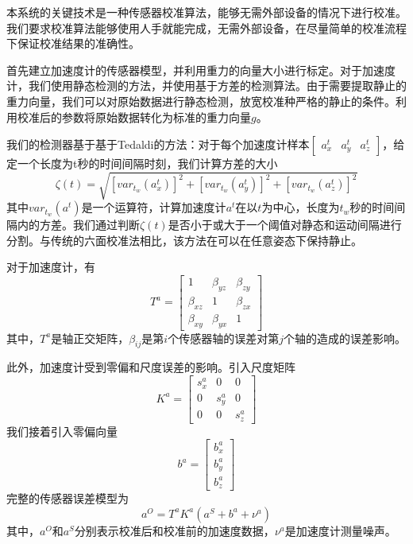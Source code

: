 \documentclass[
  type=master
]{gdutthesis}
\begin{document}
本系统的关键技术是一种传感器校准算法，能够无需外部设备的情况下进行校准。我们要求校准算法能够使用人手就能完成，无需外部设备，在尽量简单的校准流程下保证校准结果的准确性。

首先建立加速度计的传感器模型，并利用重力的向量大小进行标定\cite{jekeli2012inertial}。对于加速度计，我们使用静态检测的方法\cite{fong2008methods}，并使用基于方差的检测算法\cite{sabatini2006wavelet}。由于需要提取静止的重力向量，我们可以对原始数据进行静态检测，放宽校准种严格的静止的条件。利用校准后的参数将原始数据转化为标准的重力向量$g$。

我们的检测器基于基于Tedaldi的方法：对于每个加速度计样本$\begin{bmatrix}
	a^t_x & a^t_y & a^t_z
\end{bmatrix}$，给定一个长度为t秒的时间间隔时刻，我们计算方差的大小
\begin{equation}\label{eq:var}
	\zeta(t)=\sqrt{[var_{t_w}(a^t_x)]^2+[var_{t_w}(a^t_y)]^2+[var_{t_w}(a^t_z)]^2}
\end{equation}
其中$var_{t_w}(a^t)$是一个运算符，计算加速度计$a^t$在以$t$为中心，长度为$t_w$秒的时间间隔内的方差。我们通过判断$\zeta(t)$是否小于或大于一个阈值对静态和运动间隔进行分割。与传统的六面校准法相比\cite{尹杭2014一种}，该方法在可以在任意姿态下保持静止。

对于加速度计，有
\begin{equation}\label{eq:axiserror}
	T^{a}=
	\begin{bmatrix}
		1 & \beta_{yz} & \beta_{zy}\\
		\beta_{xz} & 1 & \beta_{zx}\\
		\beta_{xy} & \beta_{yx} & 1
	\end{bmatrix}
\end{equation}
其中，$T^a$是轴正交矩阵，$\beta_{ij}$是第$i$个传感器轴的误差对第$j$个轴的造成的误差影响。

此外，加速度计受到零偏和尺度误差的影响。引入尺度矩阵
\begin{equation}\label{eq:scaleerror}
	K^{a}=
	\begin{bmatrix}
		s^a_x & 0 & 0\\
		0 & s^a_y & 0\\
		0 & 0 & s^a_z
	\end{bmatrix}
\end{equation}
我们接着引入零偏向量
\begin{equation}\label{eq:scaleerror}
	b^{a}=
	\begin{bmatrix}
		b^a_x\\
		b^a_y\\
		b^a_z
	\end{bmatrix}
\end{equation}
完整的传感器误差模型为
\begin{equation}\label{eq:sensorerrormodel}
	a^O=T^a K^a (a^S + b^a + \nu^a)
\end{equation}
其中，$a^O$和$a^S$分别表示校准后和校准前的加速度数据，$ν^a$是加速度计测量噪声。
\end{document}

